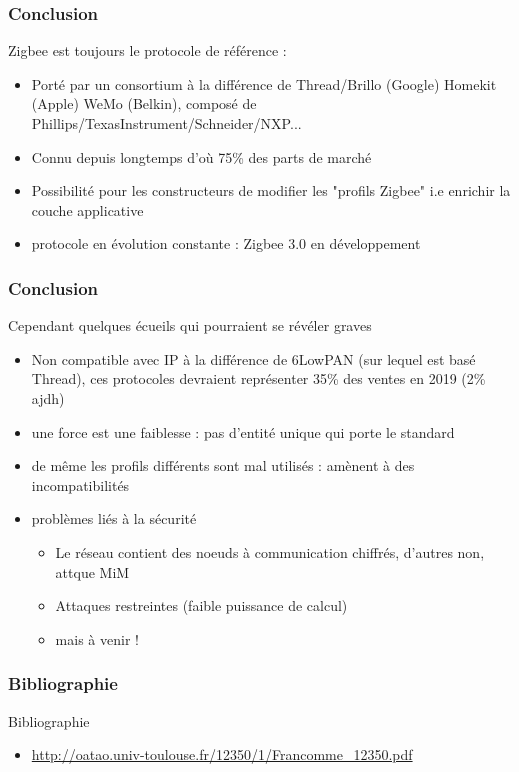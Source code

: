 \documentclass{beamer}
\begin{document}
  \begin{frame}
    \frametitle{Conclusion}
    \begin{block}{Zigbee est toujours le protocole de référence :}
      \begin{itemize}
	\item Porté par un consortium à la différence de Thread/Brillo (Google) Homekit (Apple) WeMo (Belkin), composé de Phillips/TexasInstrument/Schneider/NXP...
	\item Connu depuis longtemps d'où 75\% des parts de marché
	\item Possibilité pour les constructeurs de modifier les "profils Zigbee" i.e enrichir la couche applicative
	\item protocole en évolution constante : Zigbee 3.0 en développement
      \end{itemize}  
    \end{block}
  \end{frame}
  

  \begin{frame}
    \frametitle{Conclusion}
    \begin{block}{Cependant quelques écueils qui pourraient se révéler graves}
      \begin {itemize}
	\item Non compatible avec IP à la différence de 6LowPAN (sur lequel est basé Thread), ces protocoles devraient représenter 35\% des ventes en 2019 (2\% ajdh)
	\item une force est une faiblesse : pas d'entité unique qui porte le standard 
	\item de même les profils différents sont mal utilisés : amènent à des incompatibilités
	\item problèmes liés à la sécurité
	\begin{itemize}
	  \item Le réseau contient des noeuds à communication chiffrés, d'autres non, attque MiM
	  \item Attaques restreintes (faible puissance de calcul)
	  \item mais à venir !
	\end{itemize}
      \end{itemize}
    \end{block}
  \end{frame}
  
  \begin{frame}
   \frametitle{Bibliographie}
   \begin{block}{Bibliographie}
     \begin{itemize}
      \item \url{http://oatao.univ-toulouse.fr/12350/1/Francomme_12350.pdf}
     \end{itemize}
   \end{block}
  \end{frame}


  
\end{document}
